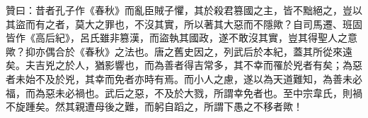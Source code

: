 \begin{pinyinscope}
 贊曰：昔者孔子作《春秋》而亂臣賊子懼，其於殺君篡國之主，皆不黜絕之，豈以其盜而有之者，莫大之罪也，不沒其實，所以著其大惡而不隱歟？自司馬遷、班固皆作《高后紀》，呂氏雖非篡漢，而盜執其國政，遂不敢沒其實，豈其得聖人之意歟？抑亦偶合於《春秋》之法也。唐之舊史因之，列武后於本紀，蓋其所從來遠矣。夫吉兇之於人，猶影響也，而為善者得吉常多，其不幸而罹於兇者有矣；為惡者未始不及於兇，其幸而免者亦時有焉。而小人之慮，遂以為天道難知，為善未必福，而為惡未必禍也。武后之惡，不及於大戮，所謂幸免者也。至中宗韋氏，則禍不旋踵矣。然其親遭母後之難，而躬自蹈之，所謂下愚之不移者歟！



\end{pinyinscope}